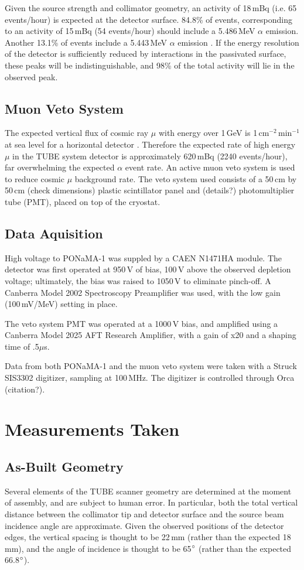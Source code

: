 Given the source strength and collimator geometry, an activity of 18\,mBq (i.e. 65 events/hour) is expected at the detector surface. 84.8\% of events, corresponding to an activity of 15\,mBq (54 events/hour) should include a 5.486\,MeV $\alpha$ emission. Another 13.1\% of events include a 5.443\,MeV $\alpha$ emission \cite{nudat}. If the energy resolution of the detector is sufficiently reduced by interactions in the passivated surface, these peaks will be indistinguishable, and 98\% of the total activity will lie in the observed peak. 

\subsection{Muon Veto System}
The expected vertical flux of cosmic ray $\mu$ with energy over 1\,GeV is 1\,cm$^{-2}$\,min$^{-1}$ at sea level for a horizontal detector \cite{PDG2016}. Therefore the expected rate of high energy $\mu$ in the TUBE system detector is approximately 620\,mBq (2240 events/hour), far overwhelming the expected $\alpha$ event rate. An active muon veto system is used to reduce cosmic $\mu$ background rate. The veto system used consists of a 50\,cm by 50\,cm (check dimensions) plastic scintillator panel and (details?) photomultiplier tube (PMT), placed on top of the cryostat. 

\subsection{Data Aquisition}
High voltage to PONaMA-1 was suppled by a CAEN N1471HA module. The detector was first operated at 950\,V of bias, 100\,V above the observed depletion voltage; ultimately, the bias was raised to 1050\,V to eliminate pinch-off. A Canberra Model 2002 Spectroscopy Preamplifier was used, with the low gain (100\,mV/MeV) setting in place. 

The veto system PMT was operated at a 1000\,V bias, and amplified using a Canberra Model 2025 AFT Research Amplifier, with a gain of x20 and a shaping time of .5$\mu$s. 

Data from both PONaMA-1 and the muon veto system were taken with a Struck SIS3302 digitizer, sampling at 100\,MHz. The digitizer is controlled through Orca (citation?).

\section{Measurements Taken} \label{sec:measurements}
\subsection{As-Built Geometry} \label{ssec:geometry}
Several elements of the TUBE scanner geometry are determined at the moment of assembly, and are subject to human error. In particular, both the total vertical distance between the collimator tip and detector surface and the source beam incidence angle are approximate. Given the observed positions of the detector edges, the vertical spacing is thought to be 22\,mm (rather than the expected 18\,mm), and the angle of incidence is thought to be 65$\degree$ (rather than the expected 66.8$\degree$). 

